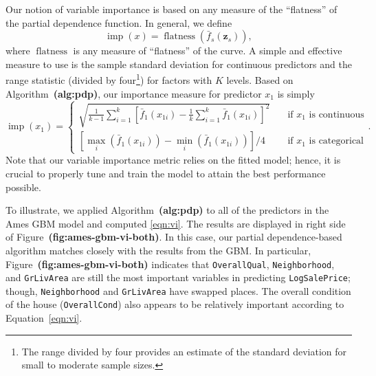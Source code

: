 \documentclass[12pt]{article}
\def\code#1{\texttt{#1}}
\def\ref#1{\textbf{(#1)}}
\DeclareMathOperator{\flatness}{flatness}
\DeclareMathOperator{\imp}{imp}
\begin{document}
Our notion of variable importance is based on any measure of the ``flatness'' of the partial dependence function. In general, we define
\begin{equation*}
  \imp\left(x\right) = \flatness\left(\bar{f}_s\left(\boldsymbol{z}_s\right)\right),
\end{equation*}
where $\flatness$ is any measure of ``flatness'' of the curve. A simple and effective measure to use is the sample standard deviation for continuous predictors and the range statistic (divided by four\footnote{The range divided by four provides an estimate of the standard deviation for small to moderate sample sizes.}) for factors with $K$ levels. Based on Algorithm~\ref{alg:pdp}, our importance measure for predictor $x_1$ is simply
\begin{equation}
\label{eqn:vi}
  \imp\left(x_1\right) = 
  \begin{cases}
    \sqrt{\frac{1}{k - 1}\sum_{i = 1}^k\left[\bar{f}_1\left(x_{1i}\right) - \frac{1}{k}\sum_{i = 1}^k\bar{f}_1\left(x_{1i}\right)\right] ^ 2} & \quad \text{if } x_1 \text{ is continuous}\\
    \left[\max_i\left(\bar{f}_1\left(x_{1i}\right)\right) - \min_i\left(\bar{f}_1\left(x_{1i}\right)\right)\right] / 4 & \quad \text{if } x_1 \text{ is categorical}
  \end{cases}.
\end{equation}
Note that our variable importance metric relies on the fitted model; hence, it is crucial to properly tune and train the model to attain the best performance possible.

To illustrate, we applied Algorithm~\ref{alg:pdp} to all of the predictors in the Ames GBM model and computed \eqref{eqn:vi}. The results are displayed in right side of Figure~\ref{fig:ames-gbm-vi-both}. In this case, our partial dependence-based algorithm matches closely with the results from the GBM. In particular, Figure~\ref{fig:ames-gbm-vi-both} indicates that \code{OverallQual}, \code{Neighborhood}, and \code{GrLivArea} are still the most important variables in predicting \code{LogSalePrice}; though, \code{Neighborhood} and \code{GrLivArea} have swapped places. The overall condition of the house (\code{OverallCond}) also appears to be relatively important according to Equation~\eqref{eqn:vi}.

\end{document}
